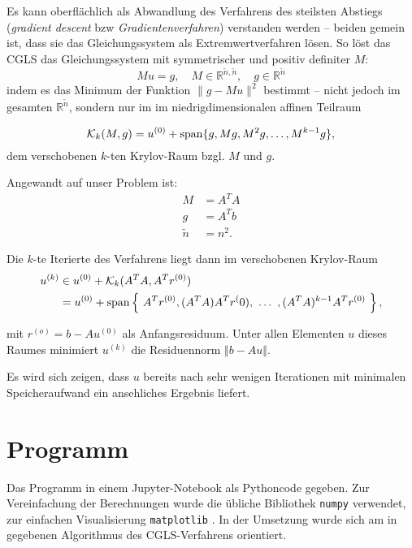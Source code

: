 Es kann oberflächlich als Abwandlung des Verfahrens des steilsten Abstiegs (\textit{gradient descent} bzw \textit{Gradientenverfahren}) verstanden werden -- beiden gemein ist, dass sie das Gleichungssystem als Extremwertverfahren lösen.
So löst das CGLS das Gleichungssystem mit symmetrischer und positiv definiter $M$:
\begin{equation}
Mu=g, \quad M \in \mathbb{R}^{\tilde{n},\tilde{n}}, \quad g \in \mathbb{R}^{\tilde{n}}
\end{equation}
indem es das Minimum der Funktion $ \| g - Mu \|^2 $ bestimmt -- nicht jedoch im gesamten $ \mathbb{R}^{\tilde{n}} $, sondern nur im im niedrigdimensionalen affinen Teilraum

\begin{equation}
\mathcal{K}_k(M,g)= u^{(0)}+ \operatorname{span} \{g,Mg,M^2g,\dots,M^{k-1}g \},
\end{equation}
dem verschobenen $k$-ten Krylov-Raum bzgl. $M$ und $g$.

Angewandt auf unser Problem ist:
\begin{equation}
\begin{split}
M &= A^TA \\
g&=A^Tb \\
\tilde{n} &= n^2.
\end{split}
\end{equation}

Die $k$-te Iterierte des Verfahrens liegt dann im verschobenen Krylov-Raum
\begin{equation}
\begin{split}
    u^{(k)}  &\in u^{(0)} + \mathcal{K}_k(A^TA,A^Tr^{(0)}) \\
    &= u^{(0)}+ \operatorname{span} \left\{\ A^Tr^{(0)} , (A^TA)A^Tr^(0) , \ \dots \ , (A^TA)^{k-1} A^Tr^{(0)} \ \right\},
\end{split}
\end{equation}

mit $r^{(o)} = b - Au^{(0)}$ als Anfangsresiduum.
Unter allen Elementen $u$ dieses Raumes minimiert $u^{(k)} $ die Residuennorm $ \Vert b - Au \Vert  $.

Es wird sich zeigen, dass $u$ bereits nach sehr wenigen Iterationen mit minimalen Speicheraufwand ein ansehliches Ergebnis liefert.

\chapter{Programm}
Das Programm in einem Jupyter-Notebook als Pythoncode gegeben. Zur Vereinfachung der Berechnungen wurde die übliche Bibliothek \texttt{numpy} \cite{NumPy} verwendet, zur einfachen Visualisierung \texttt{matplotlib} \cite{Matplotlib}.
In der Umsetzung wurde sich am in \cite{Hochbruck2002} gegebenen Algorithmus des CGLS-Verfahrens orientiert.


